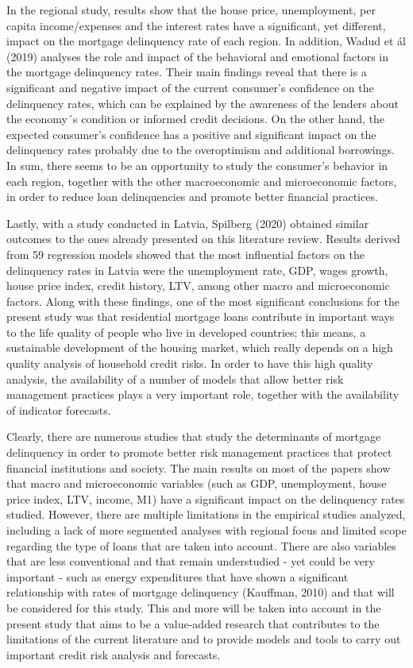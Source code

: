 \documentclass[
]{article}
\begin{document}
In the regional study, results show that the house price, unemployment,
per capita income/expenses and the interest rates have a significant,
yet different, impact on the mortgage delinquency rate of each region.
In addition, Wadud et ál (2019) analyses the role and impact of the
behavioral and emotional factors in the mortgage delinquency rates.
Their main findings reveal that there is a significant and negative
impact of the current consumer's confidence on the delinquency rates,
which can be explained by the awareness of the lenders about the
economy´s condition or informed credit decisions. On the other hand, the
expected consumer's confidence has a positive and significant impact on
the delinquency rates probably due to the overoptimism and additional
borrowings. In sum, there seems to be an opportunity to study the
consumer's behavior in each region, together with the other
macroeconomic and microeconomic factors, in order to reduce loan
delinquencies and promote better financial practices.

Lastly, with a study conducted in Latvia, Spilberg (2020) obtained
similar outcomes to the ones already presented on this literature
review. Results derived from 59 regression models showed that the most
influential factors on the delinquency rates in Latvia were the
unemployment rate, GDP, wages growth, house price index, credit history,
LTV, among other macro and microeconomic factors. Along with these
findings, one of the most significant conclusions for the present study
was that residential mortgage loans contribute in important ways to the
life quality of people who live in developed countries; this means, a
sustainable development of the housing market, which really depends on a
high quality analysis of household credit risks. In order to have this
high quality analysis, the availability of a number of models that allow
better risk management practices plays a very important role, together
with the availability of indicator forecasts.

Clearly, there are numerous studies that study the determinants of
mortgage delinquency in order to promote better risk management
practices that protect financial institutions and society. The main
results on most of the papers show that macro and microeconomic
variables (such as GDP, unemployment, house price index, LTV, income,
M1) have a significant impact on the delinquency rates studied. However,
there are multiple limitations in the empirical studies analyzed,
including a lack of more segmented analyses with regional focus and
limited scope regarding the type of loans that are taken into account.
There are also variables that are less conventional and that remain
understudied - yet could be very important - such as energy expenditures
that have shown a significant relationship with rates of mortgage
delinquency (Kauffman, 2010) and that will be considered for this study.
This and more will be taken into account in the present study that aims
to be a value-added research that contributes to the limitations of the
current literature and to provide models and tools to carry out
important credit risk analysis and forecasts.
\end{document}
